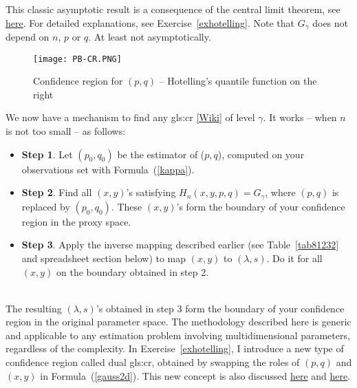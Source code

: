 \documentclass[10pt]{article}
\begin{document}
This classic asymptotic result is a consequence of the \textcolor{index}{central limit theorem}, see \href{https://stats.stackexchange.com/questions/372336/confidence-regions-on-bivariate-normal-distributions-using-hat-sigma-mle}{here}. For detailed explanations, see Exercise~\ref{exhotelling}. Note that $G_\gamma$ does not depend on $n$, $p$ or $q$. At least not asymptotically.

\begin{figure}[H]
\centering
\texttt{[image: PB-CR.PNG]}
\caption{Confidence region for $(p,q)$ -- Hotelling's quantile function on the right}
\label{fig:pbcr}
\end{figure}

We now have a mechanism to find any
\gls{gls:cr} \href{https://en.wikipedia.org/wiki/Confidence_region}{[Wiki]}
of
\textcolor{index}{level} $\gamma$. It works -- when $n$ is not too small -- as follows:
\quad \\
\begin{itemize}
\item {\bf Step 1}. Let $(p_0,q_0)$ be the estimator of ($p,q$), computed on your observations set with Formula~(\ref{kappa}).
\item {\bf Step 2}. Find all $(x,y)$'s satisfying $H_n(x,y,p,q)=G_\gamma$, where $(p,q)$ is replaced by $(p_0,q_0)$. These $(x,y)$'s form the boundary of your confidence
region in the proxy space.
\item {\bf Step 3}. Apply the inverse mapping described earlier (see Table~\ref{tab81232} and spreadsheet section below) to map $(x,y)$ to $(\lambda,s)$. Do it for all $(x,y)$ on the boundary obtained in step 2.

\end{itemize}
\quad \\
The resulting $(\lambda,s)$'s obtained in step 3 form the boundary of your confidence region in the original parameter space. The methodology described here is generic and applicable to any estimation problem involving multidimensional parameters, regardless of the complexity. In Exercise~\ref{exhotelling}, I introduce a new type of confidence region called
\textcolor{index}{dual} \gls{gls:cr},
obtained by swapping the roles of $(p,q)$ and $(x,y)$ in Formula~(\ref{gauss2d}). This new concept is also discussed
 \href{https://stats.stackexchange.com/questions/564702/two-possible-definitions-of-confidence-regions-which-one-to-choose}{here}
and \href{https://www.datasciencecentral.com/model-free-inference-for-machine-learning-professionals/}{here}.
\end{document}

